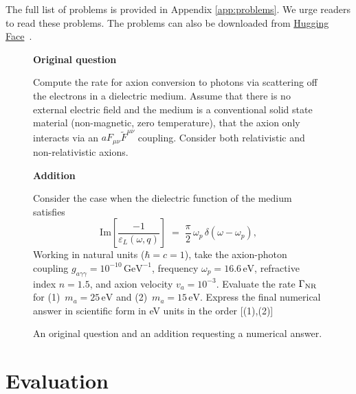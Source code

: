 \documentclass[aps,prd,reprint,superscriptaddress,nofootinbib]{revtex4-2}
\newcommand{\benchmarkname}{Hugging Face}
\newcommand{\benchmarkurl}{https://huggingface.co/datasets/RameshChandra1/TheoPhysEval}
\DeclareRobustCommand{\benchmarkrepo}{\href{\benchmarkurl}{\benchmarkname}}
\begin{document}
The full list of problems is provided in Appendix \ref{app:problems}. We urge readers to read these problems. The problems can also be downloaded from \benchmarkrepo{}~\cite{theophyseval2026dataset}.

\begin{figure}[t]
\renewcommand{\figurename}{Box}
\centering
\begin{tcbraster}[
  raster columns=2,
  raster equal height=rows,
  raster column skip=12pt,
  raster before skip=0pt,
  raster after skip=0pt,
  colback=numericalpink,
  colframe=numericalborder,
  boxrule=0.6pt,
  enhanced,
  segmentation engine=standard,
  borderline={0.6pt}{0pt}{tcbcolframe},
  sharp corners,
  boxsep=0pt,
  left=10pt,right=10pt,top=10pt,bottom=10pt,
  valign=top
]
\begin{tcolorbox}
\raggedright
\textcolor{numericalheading}{\textbf{Original question}}\par\smallskip
Compute the rate for axion conversion to photons via scattering off the electrons in a dielectric medium. Assume that there is no external electric field and the medium is a conventional solid state material (non-magnetic, zero temperature), that the axion only interacts via an $a F_{\mu\nu}\widetilde{F}^{\mu\nu}$ coupling. Consider both relativistic and non-relativistic axions.
\end{tcolorbox}
\begin{tcolorbox}
\raggedright
\textcolor{numericalheading}{\textbf{Addition}}\par\smallskip
Consider the case when the dielectric function of the medium satisfies
\begin{equation}
    \mathrm{Im}\!\left[\frac{-1}{\varepsilon_L(\omega, q)}\right]
    \;=\; \frac{\pi}{2}\,\omega_p\,\delta(\omega-\omega_p),
\end{equation}
Working in natural units ($\hbar = c=1$), take the axion-photon coupling $g_{a\gamma\gamma}=10^{-10}\,\mathrm{GeV}^{-1}$, frequency $\omega_p = 16.6\,\mathrm{eV}$,
refractive index $n = 1.5$, and axion velocity $v_a = 10^{-3}$.
Evaluate the rate $\Gamma_{\rm NR}$ for
(1)~$m_a = 25\,\mathrm{eV}$ and (2)~$m_a = 15\,\mathrm{eV}$. Express the final numerical answer in scientific form in eV units in the order [(1),(2)]
\end{tcolorbox}
\end{tcbraster}
\caption{An original question and an addition requesting a numerical answer.}
\label{boxnumerical}
\end{figure}

\section{Evaluation \label{secbenchmark}}
\end{document}
